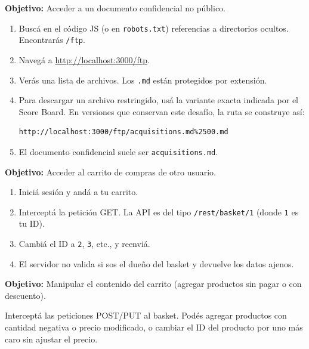 \documentclass[11pt,a4paper]{article}
\begin{document}
\begin{desafio}
\textbf{Objetivo:} Acceder a un documento confidencial no público.
\begin{solucion}
\begin{enumerate}[leftmargin=*]
  \item Buscá en el código JS (o en \texttt{robots.txt}) referencias a directorios ocultos. Encontrarás \texttt{/ftp}.
  \item Navegá a \url{http://localhost:3000/ftp}.
  \item Verás una lista de archivos. Los \texttt{.md} están protegidos por extensión.
  \item Para descargar un archivo restringido, usá la variante exacta indicada por el Score Board. En versiones que conservan este desafío, la ruta se construye así:
  \begin{lstlisting}
http://localhost:3000/ftp/acquisitions.md%2500.md
  \end{lstlisting}
  \item El documento confidencial suele ser \texttt{acquisitions.md}.
\end{enumerate}
\end{solucion}
\end{desafio}

\begin{desafio}
\textbf{Objetivo:} Acceder al carrito de compras de otro usuario.
\begin{solucion}
\begin{enumerate}[leftmargin=*]
  \item Iniciá sesión y andá a tu carrito.
  \item Interceptá la petición GET. La API es del tipo \texttt{/rest/basket/1} (donde \texttt{1} es tu ID).
  \item Cambiá el ID a \texttt{2}, \texttt{3}, etc., y reenviá.
  \item El servidor no valida si sos el dueño del basket y devuelve los datos ajenos.
\end{enumerate}
\end{solucion}
\end{desafio}

\begin{desafio}
\textbf{Objetivo:} Manipular el contenido del carrito (agregar productos sin pagar o con descuento).
\begin{solucion}
Interceptá las peticiones POST/PUT al basket. Podés agregar productos con cantidad negativa o precio modificado, o cambiar el ID del producto por uno más caro sin ajustar el precio.
\end{solucion}
\end{desafio}
\end{document}
